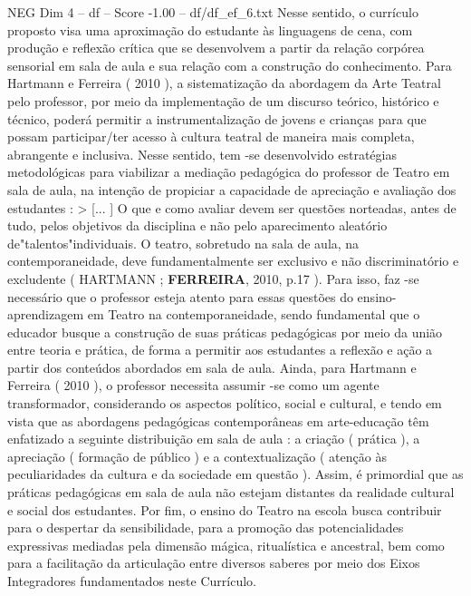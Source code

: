 \begin{textsample}{NEG Dim 4 – df – Score -1.00 – df/df\_ef\_6.txt}
Nesse sentido, o currículo proposto visa uma aproximação do estudante às linguagens de cena, com produção e reflexão crítica que se desenvolvem a partir da relação corpórea sensorial em sala de aula e sua relação com a construção do conhecimento.
Para Hartmann e Ferreira ( 2010 ), a sistematização da abordagem da Arte Teatral pelo professor, por meio da implementação de um discurso teórico, histórico e técnico, poderá permitir a instrumentalização de jovens e crianças para que possam participar/ter acesso à cultura teatral de maneira mais completa, abrangente e inclusiva.
Nesse sentido, tem -se desenvolvido estratégias metodológicas para viabilizar a mediação pedagógica do professor de Teatro em sala de aula, na intenção de propiciar a capacidade de apreciação e avaliação dos estudantes : > [... ] O que e como avaliar devem ser questões norteadas, antes de tudo, pelos objetivos da disciplina e não pelo aparecimento aleatório de"talentos"individuais.
O teatro, sobretudo na sala de aula, na contemporaneidade, deve fundamentalmente ser exclusivo e não discriminatório e excludente ( HARTMANN ; \textbf{FERREIRA}, 2010, p.17 ).
Para isso, faz -se necessário que o professor esteja atento para essas questões do ensino-aprendizagem em Teatro na contemporaneidade, sendo fundamental que o educador busque a construção de suas práticas pedagógicas por meio da união entre teoria e prática, de forma a permitir aos estudantes a reflexão e ação a partir dos conteúdos abordados em sala de aula.
Ainda, para Hartmann e Ferreira ( 2010 ), o professor necessita assumir -se como um agente transformador, considerando os aspectos político, social e cultural, e tendo em vista que as abordagens pedagógicas contemporâneas em arte-educação têm enfatizado a seguinte distribuição em sala de aula : a criação ( prática ), a apreciação ( formação de público ) e a contextualização ( atenção às peculiaridades da cultura e da sociedade em questão ).
Assim, é primordial que as práticas pedagógicas em sala de aula não estejam distantes da realidade cultural e social dos estudantes.
Por fim, o ensino do Teatro na escola busca contribuir para o despertar da sensibilidade, para a promoção das potencialidades expressivas mediadas pela dimensão mágica, ritualística e ancestral, bem como para a facilitação da articulação entre diversos saberes por meio dos Eixos Integradores fundamentados neste Currículo.

\end{textsample}
